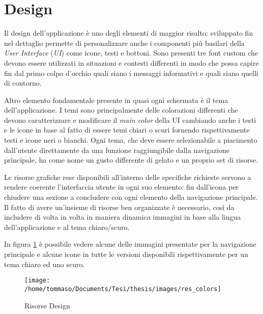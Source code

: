 \section{Design}

Il design dell'applicazione è uno degli elementi di maggior risalto:
sviluppato fin nel dettaglio permette di personalizzare anche i componenti
più basilari della \emph{User Interface} (\emph{UI}) come icone, testi
e bottoni. Sono presenti tre font custom che devono essere utilizzati
in situazioni e contesti differenti in modo che possa capire fin dal
primo colpo d'occhio quali siano i messaggi informativi e quali siano
quelli di contorno.\bigskip{}

Altro elemento fondamentale presente in quasi ogni schermata è il
tema dell'applicazione. I temi sono principalmente delle colorazioni
differenti che devono caratterizzare e modificare il \emph{main color}
della UI cambiando anche i testi e le icone in base al fatto di essere
temi chiari o scuri fornendo rispettivamente testi e icone neri o
bianchi. Ogni tema, che deve essere selezionabile a piacimento dall'utente
direttamente da una funzione raggiungibile dalla navigazione principale,
ha come nome un gusto differente di gelato e un proprio set di risorse.\bigskip{}

Le risorse grafiche rese disponibili all'interno delle specifiche
richieste servono a rendere coerente l'interfaccia utente in ogni
suo elemento: fin dall'icona per chiudere una sezione a concludere
con ogni elemento della navigazione principale. Il fatto di avere
un'insieme di risorse ben organizzate è necessario, così da includere
di volta in volta in maniera dinamica immagini in base alla lingua
dell'applicazione e al tema chiaro/scuro.

In figura \ref{fig:Risorse-Design} è possibile vedere alcune delle
immagini presentate per la navigazione principale e alcune icone in
tutte le versioni disponibili rispettivamente per un tema chiaro ed
uno scuro.
\begin{center}
\begin{figure}[H]
\begin{centering}
\texttt{[image: /home/tommaso/Documents/Tesi/thesis/images/res\_colors]}
\par\end{centering}
\caption{\label{fig:Risorse-Design}Risorse Design}

\end{figure}
\par\end{center}

